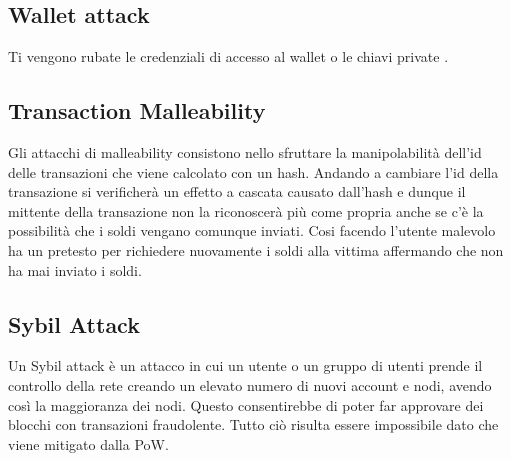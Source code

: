 \subsection{Wallet attack}

Ti vengono rubate le credenziali di accesso al wallet o le chiavi private
.

\subsection{Transaction Malleability }

Gli attacchi di malleability consistono nello sfruttare la manipolabilità
dell'id delle transazioni che viene calcolato con un hash. Andando a cambiare
l'id della transazione si verificherà un effetto a cascata causato dall'hash e
dunque il mittente della transazione non la riconoscerà più come propria anche
se c'è la possibilità che i soldi vengano comunque inviati. Cosi facendo
l'utente malevolo ha un pretesto per richiedere nuovamente i soldi alla vittima
affermando che non ha mai inviato i soldi.

\subsection{Sybil Attack}

Un Sybil attack è un attacco in cui un utente o un gruppo di utenti prende il
controllo della rete creando un elevato numero di nuovi account e nodi, avendo
così la maggioranza dei nodi. Questo consentirebbe di poter far approvare dei
blocchi con transazioni fraudolente. Tutto ciò risulta essere impossibile dato
che viene mitigato dalla PoW.